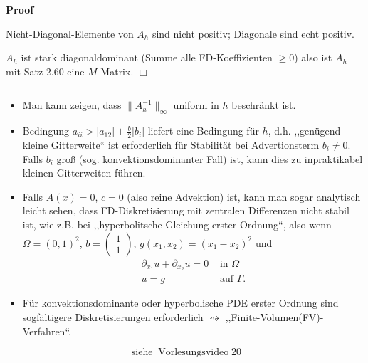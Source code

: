 \documentclass{book}
\newcommand{\tmdummy}{$\mbox{}$}
\newcommand{\tmop}[1]{\ensuremath{\operatorname{#1}}}
\newcommand{\tmtextbf}[1]{\text{{\bfseries{#1}}}}
\newenvironment{itemizedot}{\begin{itemize} \renewcommand{\labelitemi}{$\bullet$}\renewcommand{\labelitemii}{$\bullet$}\renewcommand{\labelitemiii}{$\bullet$}\renewcommand{\labelitemiv}{$\bullet$}}{\end{itemize}}
\newenvironment{proof}{\noindent\textbf{Proof\ }}{\hspace*{\fill}$\Box$\medskip}
\begin{document}
\begin{proof}
  \
  
  Nicht-Diagonal-Elemente von $A_h$ sind nicht positiv; Diagonale sind echt
  positiv.
  
  $A_h$ ist stark diagonaldominant (Summe alle FD-Koeffizienten $\geqslant 0$)
  also ist $A_h$ mit Satz 2.60 eine $M$-Matrix.
\end{proof}

\begin{remark*}
  {\tmdummy}
  
  \begin{itemizedot}
    \item Man kann zeigen, dass $\| A^{- 1}_h \|_{\infty}$ uniform in $h$
    beschr{\"a}nkt ist.
    
    \item Bedingung $a_{i i} > | a_{12} | + \frac{b}{2} | b_i |$ liefert eine
    Bedingung f{\"u}r $h$, d.h. ,,gen{\"u}gend kleine Gitterweite`` ist
    erforderlich f{\"u}r Stabilit{\"a}t bei Advertionsterm $b_i \neq 0$. Falls
    $b_i$ gro{\ss} (sog. konvektionsdominanter Fall) ist, kann dies zu
    inpraktikabel kleinen Gitterweiten f{\"u}hren.
    
    \item Falls $A (x) = 0$, $c = 0$ (also reine Advektion) ist, kann man
    sogar analytisch leicht sehen, dass FD-Diskretisierung mit zentralen
    Differenzen nicht stabil ist, wie z.B. bei ,,hyperbolitsche Gleichung
    erster Ordnung``, also wenn $\Omega = (0, 1)^2$, $b =
    \left(\begin{array}{c}
      1\\
      1
    \end{array}\right)$, $g (x_1, x_2) = (x_1 - x_2)^2$ und
    \[ \begin{array}{ll}
         \partial_{x_1} u + \partial_{x_2} u = 0 & \text{ in } \Omega\\
         u = g & \text{ auf } \Gamma .
       \end{array} \]
    \item F{\"u}r konvektionsdominante oder hyperbolische PDE erster Ordnung
    sind sogf{\"a}ltigere Diskretisierungen erforderlich $\rightsquigarrow$
    ,,Finite-Volumen(FV)-Verfahren``.
  \end{itemizedot}
\end{remark*}

\begin{example*}
  \tmtextbf{(Numerisches Beispiel)}
  \[ \tmop{siehe} \tmop{Vorlesungsvideo} 20 \]
\end{example*}
\end{document}
